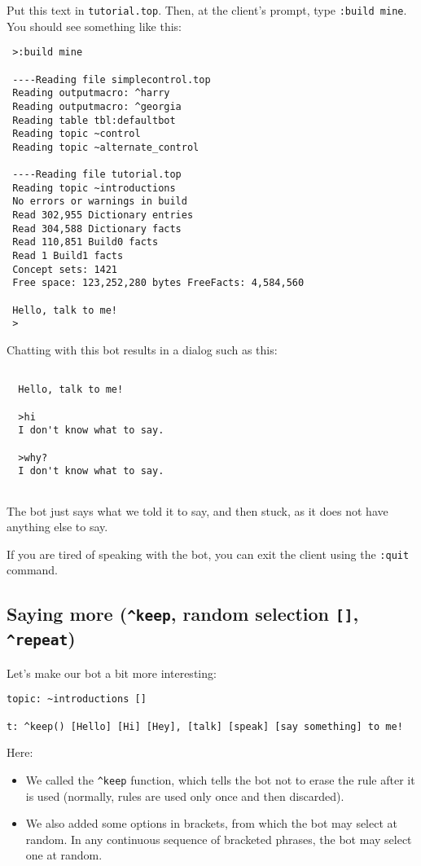 \documentclass[]{article}
\begin{document}
Put this text in \texttt{tutorial.top}. Then, at the client's prompt,
type \texttt{:build\ mine}. You should see something like this:

\begin{verbatim}
 >:build mine
 
 ----Reading file simplecontrol.top
 Reading outputmacro: ^harry
 Reading outputmacro: ^georgia
 Reading table tbl:defaultbot
 Reading topic ~control
 Reading topic ~alternate_control
 
 ----Reading file tutorial.top
 Reading topic ~introductions
 No errors or warnings in build
 Read 302,955 Dictionary entries
 Read 304,588 Dictionary facts
 Read 110,851 Build0 facts
 Read 1 Build1 facts
 Concept sets: 1421
 Free space: 123,252,280 bytes FreeFacts: 4,584,560
 
 Hello, talk to me!
 >
\end{verbatim}

Chatting with this bot results in a dialog such as this:

\begin{verbatim}

  Hello, talk to me!
  
  >hi
  I don't know what to say.
  
  >why?
  I don't know what to say.
 
\end{verbatim}

The bot just says what we told it to say, and then stuck, as it does not
have anything else to say.

If you are tired of speaking with the bot, you can exit the client using
the \texttt{:quit} command.

\subsection{\texorpdfstring{Saying more (\texttt{\^{}keep}, random
selection \texttt{{[}{]}},
\texttt{\^{}repeat})}{Saying more (\^{}keep, random selection {[}{]}, \^{}repeat)}}\label{saying-more-keep-random-selection-repeat}

Let's make our bot a bit more interesting:

\begin{verbatim}
topic: ~introductions []

t: ^keep() [Hello] [Hi] [Hey], [talk] [speak] [say something] to me!
\end{verbatim}

Here:

\begin{itemize}
\item
  We called the \texttt{\^{}keep} function, which tells the bot not to
  erase the rule after it is used (normally, rules are used only once
  and then discarded).
\item
  We also added some options in brackets, from which the bot may select
  at random. In any continuous sequence of bracketed phrases, the bot
  may select one at random.
\end{itemize}
\end{document}
